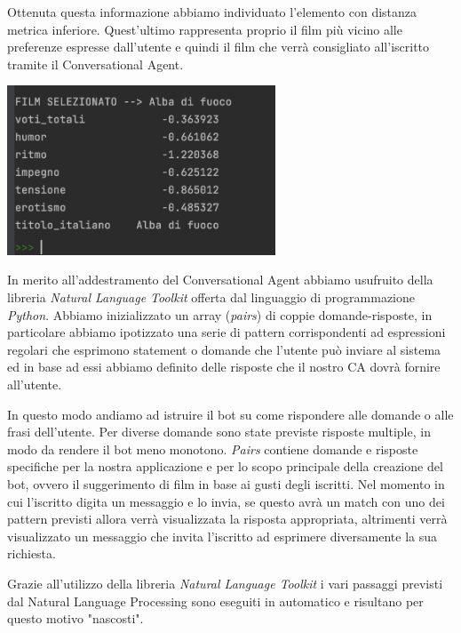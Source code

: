 \documentclass[a4paper, 10pt]{report}
\begin{document}
            Ottenuta questa informazione abbiamo individuato l'elemento con distanza metrica inferiore. Quest'ultimo rappresenta proprio
            il film più vicino alle preferenze espresse dall'utente e quindi il film che verrà consigliato all'iscritto tramite il
            Conversational Agent.
            \begin{center}
                \includegraphics[width=8cm]{modelling/filmSelezionato}\\
            \end{center}


            In merito all'addestramento del Conversational Agent abbiamo usufruito della libreria \textit{Natural Language Toolkit}
            offerta dal linguaggio di programmazione \textit{Python}. Abbiamo inizializzato un array (\textit{pairs}) di coppie domande-risposte,
            in particolare abbiamo ipotizzato una serie di pattern corrispondenti ad espressioni regolari che esprimono statement o domande che
            l'utente può inviare al sistema ed in base ad essi abbiamo definito delle risposte che il nostro CA dovrà fornire all'utente.

            In questo modo andiamo ad istruire il bot su come rispondere alle domande o alle frasi dell'utente. Per diverse domande
            sono state previste risposte multiple, in modo da rendere il bot meno monotono.
            \textit{Pairs} contiene domande e risposte specifiche per la nostra applicazione e per lo scopo
            principale della creazione del bot, ovvero il suggerimento di film in base ai gusti degli iscritti.
            Nel momento in cui l'iscritto digita un messaggio e lo invia, se questo avrà un match con uno dei pattern previsti allora
            verrà visualizzata la risposta appropriata, altrimenti verrà visualizzato un messaggio che invita l'iscritto
            ad esprimere diversamente la sua richiesta.

            Grazie all'utilizzo della libreria \textit{Natural Language Toolkit} i vari passaggi previsti dal Natural Language Processing
            sono eseguiti in automatico e risultano per questo motivo "nascosti".
\end{document}
